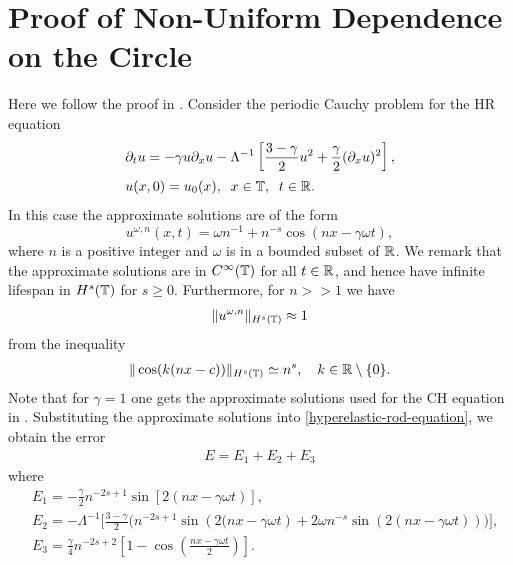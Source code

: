 \section{Proof of Non-Uniform Dependence 
on the Circle}
\label{sec:3}

%
Here we follow the proof in \cite{Himonas:2010}. 
Consider the periodic Cauchy problem for the HR equation
%
\begin{align}
& \partial_t u = -\gamma u \partial_x u  - \Lambda^{-1} \left[ \frac{3 - 
\gamma}{2}u^2 +
\frac{\gamma}{2}(\partial_x u)^2 \right] ,
\label{hyperelastic-rod-equation}
\\
& u(x,0) = u_0(x), \; \; x \in \mathbb{T}, \; \; t \in \mathbb{R}.  \label{init-cond}
\end{align}
%
%
%
In this case the  approximate solutions are of the form
%
%
\begin{equation}
\label{approx-solutions-form}
u^{\omega,n}(x,t) = \omega n^{-1} + n^{-s} \cos \left( nx - \gamma \omega t
\right), 
\end{equation}
where $n$ is a positive integer and $\omega$ is in a bounded subset of 
$\mathbb{R}$. We remark that the approximate 
solutions are in $C^\infty(\mathbb{T})$ for all $t \in \mathbb{R}$, and hence have 
infinite lifespan in $H^s(\mathbb{T})$ for $s  \ge 0$. Furthermore, for $n>>1$ we 
have 
%
%
\begin{equation}
\label{bound-approx}
\begin{split}
\|u^{\omega,n} \|_{H^s(\mathbb{T})} \approx 1	
\end{split}
\end{equation}
%
%
from the inequality
\begin{equation}
\label{1m}
\begin{split}
\|\cos(k(nx-c))\|_{H^s(\mathbb{T})} \simeq n^s, \quad k \in \mathbb{R} \setminus
\{0\}.
\end{split}
\end{equation}
%
%
%
%
Note that for $\gamma=1$ 
one gets the  approximate solutions
used for the CH equation in \cite{Himonas:2010}.
%
%
Substituting the approximate solutions into 
\eqref{hyperelastic-rod-equation}, we obtain the error
%
%
\begin{equation}
\begin{split}
E=
E_1 + E_2 + E_3 \label{57}
\end{split}
\end{equation}
%
%
where
\begin{align}
\label{90u}
& E_1 =
- \frac{\gamma}{2}n^{-2s+1}\sin\left[ 2\left( nx - \gamma \omega t \right)
\right],
\\
\label{90ah}
& E_2 = - \Lambda^{-1} \bigg[ \frac{3-\gamma}{2} \bigg (
n^{-2s+1} \sin\left( 2(nx - \gamma \omega t \right) + 2\omega n^{-s} \sin( 
2(nx - \gamma \omega t))
\bigg )
\bigg ],
\\
& E_3 = \frac{\gamma}{4}
n^{-2s+2} \left [ 1- \cos \left (\frac{nx - \gamma \omega t}{2} \right) 
\right ].
\label{90}
\end{align}
